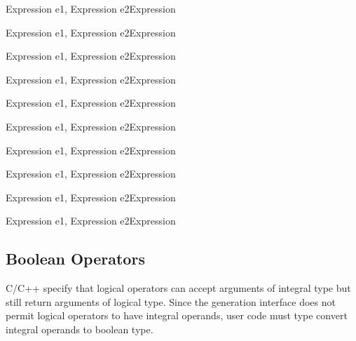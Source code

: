 	{Expression e1, Expression e2}{Expression}
\begin{functionality}
\cxxOp
\end{functionality}
	{Expression e1, Expression e2}{Expression}
\begin{functionality}
\cxxOp
\end{functionality}
	{Expression e1, Expression e2}{Expression}
\begin{functionality}
\cxxOp
\end{functionality}
	{Expression e1, Expression e2}{Expression}
\begin{functionality}
\cxxOp
\end{functionality}
	{Expression e1, Expression e2}{Expression}
\begin{functionality}
\cxxOp
\end{functionality}
	{Expression e1, Expression e2}{Expression}
\begin{functionality}
\cxxOp
\end{functionality}
	{Expression e1, Expression e2}{Expression}
\begin{functionality}
\cxxOp
\end{functionality}
	{Expression e1, Expression e2}{Expression}
\begin{functionality}
\cxxOp
\end{functionality}
	{Expression e1, Expression e2}{Expression}
\begin{functionality}
\cxxOp
\end{functionality}
{Expression e1, Expression e2}{Expression}
\begin{functionality}
\cxxOp
\end{functionality}

\subsection{Boolean Operators}\label{sec:logicOp}
 C/C++ specify that logical operators can
accept arguments of integral type but still return arguments of
logical type.  Since the generation interface does not permit logical
operators to have integral operands, user code must type convert
integral operands to boolean type.

